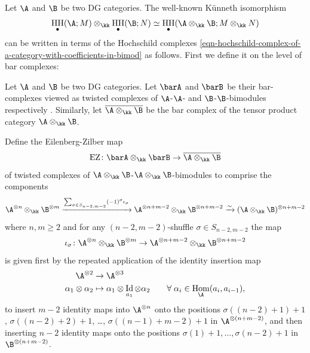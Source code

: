 \documentclass[12pt,a4paper,reqno]{amsart}
\DeclareMathOperator{\homm}{Hom}
\DeclareMathOperator{\id}{Id}
\DeclareMathOperator{\hochhom}{{HH}}
\DeclareMathOperator\ezmap{{EZ}}
\begin{document}
Let $\A$ and $\B$ be two DG categories. The well-known K{\"u}nneth isomorphism 
\begin{equation} 
\hochhom_\bullet(\A; M) \otimes_{\kk}  \hochhom_\bullet(\B; N)
\simeq 
\hochhom_\bullet(\A \otimes_{\kk} \B; M \otimes_\kk N)
\end{equation}
can be written in terms of the Hochschild complexes
\eqref{eqn-hochschild-complex-of-a-category-with-coefficients-in-bimod} as follows. First we
define it on the level of bar complexes:
\begin{defn}
Let $\A$ and $\B$ be two DG categories. Let $\barA$ and $\barB$ be
their bar-complexes viewed as twisted complexes of $\A$-$\A$- 
and $\B$-$\B$-bimodules respectively
\cite[Defn.
2.24]{AnnoLogvinenko-BarCategoryOfModulesAndHomotopyAdjunctionForTensorFunctors}.
Similarly, let $\overline{\A \otimes_\kk \B}$ be the bar complex of
the tensor product category $\A \otimes_\kk \B$. 

Define the Eilenberg-Zilber map 
$$ \ezmap\colon
\barA \otimes_\kk \barB \rightarrow \overline{\A \otimes_\kk \B} $$
of twisted complexes of $\A \otimes_\kk \B$-$\A \otimes_\kk \B$-bimodules
to comprise the components
\begin{equation}
\label{eqn-kunneth-morphism-for-bar-complexes}
\A^{\otimes n} \otimes_\kk \B^{\otimes m}
\xrightarrow{\sum_{\sigma \in S_{n-2,m-2}} (-1)^{\sigma}
\iota_\sigma}
\A^{\otimes n+m-2} \otimes_\kk \B^{\otimes n+m-2}
\xrightarrow{\sim}
(\A\otimes_\kk \B)^{\otimes n+m-2}
\end{equation}
where $n,m \geq 2$ and  
for any $(n-2, m-2)$-shuffle $\sigma \in S_{n-2,m-2}$ the map 
$$ \iota_\sigma\colon 
\A^{\otimes n} \otimes_\kk \B^{\otimes m}
\rightarrow 
\A^{\otimes n+m-2} \otimes_\kk \B^{\otimes n+m-2}
$$
is given first by the repeated application of the identity insertion map 
\begin{align*}
\A^{\otimes 2} & \rightarrow \A^{\otimes 3} \\
\alpha_1 \otimes \alpha_2 & \mapsto \alpha_1 \otimes \id_{a_1} \otimes \alpha_2
\quad \quad \forall\; \alpha_i \in \homm_{\A}(a_i, a_{i-1}),
\end{align*}
to insert $m-2$ identity maps into $\A^{\otimes n}$ onto the positions 
$\sigma((n-2)+1)+1$, $\sigma((n-2)+2)+1$, \dots, $\sigma((n-1)+m-2)+1$ in 
$\A^{\otimes(n+m-2)}$, 
and then inserting $n-2$ identity maps 
onto the positions $\sigma(1)+1, \dots, \sigma(n-2)+1$
in $\B^{\otimes (n+m-2)}$.
\end{defn}
\end{document}
